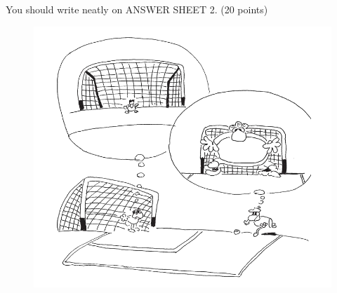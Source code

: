 You should write neatly on ANSWER SHEET 2. (20 points)

\begin{figure}[h!]
	\centering
	\includegraphics[width=0.56\linewidth]{picture/2007.png}
\end{figure}

